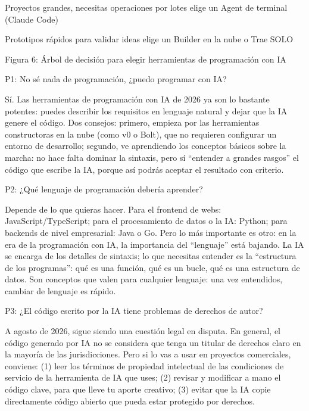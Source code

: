 Proyectos grandes, necesitas operaciones por lotes elige un Agent de terminal (Claude Code)

Prototipos rápidos para validar ideas elige un Builder en la nube o Trae SOLO

\begin{center}\small\color{gray}Figura 6: Árbol de decisión para elegir herramientas de programación con IA\end{center}


P1: No sé nada de programación, ¿puedo programar con IA?

Sí. Las herramientas de programación con IA de 2026 ya son lo bastante potentes: puedes describir los requisitos en lenguaje natural y dejar que la IA genere el código. Dos consejos: primero, empieza por las herramientas constructoras en la nube (como v0 o Bolt), que no requieren configurar un entorno de desarrollo; segundo, ve aprendiendo los conceptos básicos sobre la marcha: no hace falta dominar la sintaxis, pero sí “entender a grandes rasgos” el código que escribe la IA, porque así podrás aceptar el resultado con criterio.

P2: ¿Qué lenguaje de programación debería aprender?

Depende de lo que quieras hacer. Para el frontend de webs: JavaScript/TypeScript; para el procesamiento de datos o la IA: Python; para backends de nivel empresarial: Java o Go. Pero lo más importante es otro: en la era de la programación con IA, la importancia del “lenguaje” está bajando. La IA se encarga de los detalles de sintaxis; lo que necesitas entender es la “estructura de los programas”: qué es una función, qué es un bucle, qué es una estructura de datos. Son conceptos que valen para cualquier lenguaje: una vez entendidos, cambiar de lenguaje es rápido.

P3: ¿El código escrito por la IA tiene problemas de derechos de autor?

A agosto de 2026, sigue siendo una cuestión legal en disputa. En general, el código generado por IA no se considera que tenga un titular de derechos claro en la mayoría de las jurisdicciones. Pero si lo vas a usar en proyectos comerciales, conviene: (1) leer los términos de propiedad intelectual de las condiciones de servicio de la herramienta de IA que uses; (2) revisar y modificar a mano el código clave, para que lleve tu aporte creativo; (3) evitar que la IA copie directamente código abierto que pueda estar protegido por derechos.

